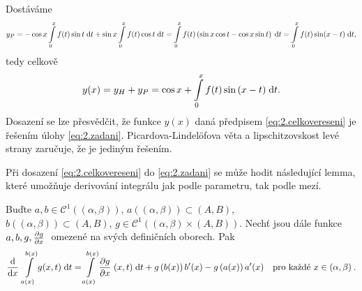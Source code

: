 Dostáváme
\begin{equation}
        y_P=-\cos x\int\limits_0^x f(t)\sin t\;\mathrm{d}t + \sin x \int\limits_0^xf(t)\cos t\;\mathrm{d}t =\int\limits_0^x f(t)\left(\sin x \cos t-\cos x\sin t\right) \;\mathrm{d}t= \int\limits_0^xf(t) \sin(x-t)\;\mathrm{d}t,
\end{equation}
tedy celkově
\begin{equation}
    y(x)=y_H + y_P = \cos x+\int\limits_0^x f(t)\sin{(x-t)}\;\mathrm{d}t.
    \label{eq:2.celkovereseni}
\end{equation}
Dosazení se lze přesvědčit, že funkce $y(x)$ daná předpisem \eqref{eq:2.celkovereseni} je řešením úlohy \eqref{eq:2.zadani}. Picardova-Lindelöfova věta a lipschitzovskost levé strany zaručuje, že je jediným řešením.

\begin{remark}
Při dosazení \eqref{eq:2.celkovereseni} do \eqref{eq:2.zadani} se může hodit následující lemma, které umožňuje derivování integrálu jak podle parametru, tak podle mezí.
\end{remark}
\begin{lemma}
\label{lemma:2.derivacemezi}
Buďte $a,b\in\mathcal{C}^1((\alpha,\beta))$, $a((\alpha,\beta))\subset (A,B)$,\\ $b((\alpha,\beta))\subset (A,B)$, $g\in\mathcal{C}^1((\alpha,\beta)\times(A,B))$. Nechť jsou dále funkce $a,b,g,\frac{\partial g}{\partial x} \;$ omezené na svých definičních oborech. Pak
\begin{align}
    \frac{\mathrm{d} }{\mathrm{d} x} \;\int\limits_{a(x)}^{b(x)} g(x,t)\;\mathrm{d}t = \int\limits_{a(x)}^{b(x)} \frac{\partial g}{\partial x} \;(x,t)\;\mathrm{d}t + g \left( b(x) \right) b'(x)-g \left( a(x) \right) a'(x) \quad \text{pro každé } x\in(\alpha,\beta) \:.
\end{align}
\end{lemma}

